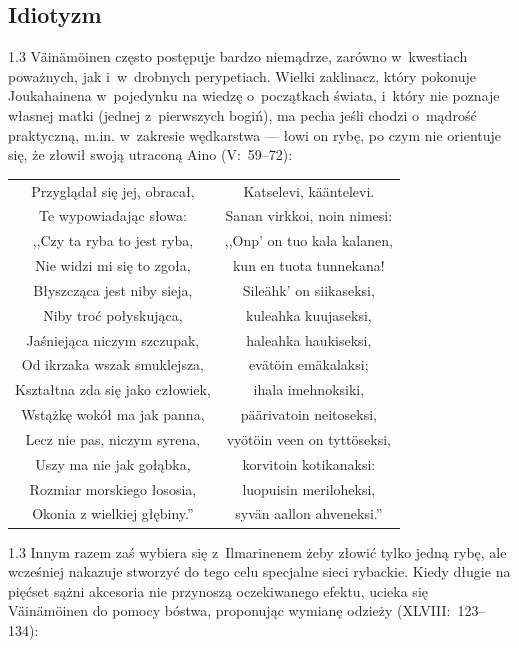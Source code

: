 \documentclass[11pt,a4paper,twoside]{report}
\begin{document}
\subsection*{Idiotyzm}
\begin{spacing}{1.3}
Väinämöinen często postępuje bardzo niemądrze, zarówno w~kwestiach poważnych, jak i~w~drobnych perypetiach. Wielki zaklinacz, który pokonuje Joukahainena w~pojedynku na wiedzę o~początkach świata, i~który nie poznaje własnej matki (jednej z~pierwszych bogiń), ma pecha jeśli chodzi o~mądrość praktyczną, m.in. w~zakresie wędkarstwa --- łowi on rybę, po czym nie orientuje się, że złowił swoją utraconą Aino (V:~59--72):
\end{spacing}
{\centering
\small
\begin{longtable}{c c}
Przyglądał się jej, obracał, 		&Katselevi, kääntelevi. \\
Te wypowiadając słowa: 		&Sanan virkkoi, noin nimesi: \\
,,Czy ta ryba to jest ryba, 			&,,Onp' on tuo kala kalanen, \\
Nie widzi mi się to zgoła, 		&kun en tuota tunnekana! \\
Błyszcząca jest niby sieja, 		&Sileähk' on siikaseksi, \\
Niby troć połyskująca, 			&kuleahka kuujaseksi, \\
Jaśniejąca niczym szczupak, 		&haleahka haukiseksi, \\
Od ikrzaka wszak smuklejsza, 		&evätöin emäkalaksi; \\
Kształtna zda się jako człowiek, 		&ihala imehnoksiki, \\
Wstążkę wokół ma jak panna, 		&päärivatoin neitoseksi, \\ \pagebreak
Lecz nie pas, niczym syrena, 		&vyötöin veen on tyttöseksi, \\
Uszy ma nie jak gołąbka, 		&korvitoin kotikanaksi: \\
Rozmiar morskiego łososia, 		&luopuisin meriloheksi, \\
Okonia z wielkiej głębiny.'' 		&syvän aallon ahveneksi.'' \\
\end{longtable}
}
\begin{spacing}{1.3}
Innym razem zaś wybiera się z~Ilmarinenem żeby złowić tylko jedną rybę, ale wcześniej nakazuje stworzyć do tego celu specjalne sieci rybackie. Kiedy długie na pięćset sążni akcesoria nie przynoszą oczekiwanego efektu, ucieka się Väinämöinen do pomocy bóstwa, proponując wymianę odzieży (XLVIII:~123--134):
\end{spacing}
\end{document}
